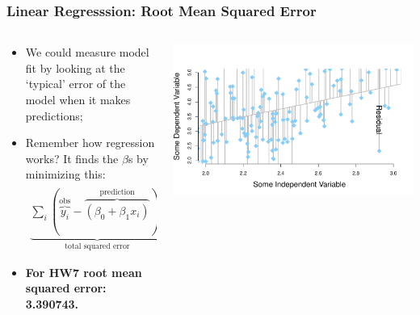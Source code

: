 \documentclass[aspectratio=169]{beamer}
\theoremstyle{principle}
\begin{document}
\begin{frame}
\frametitle{Linear Regresssion: Root Mean Squared Error}

\begin{columns}
\begin{column}{0.5\textwidth}

\begin{itemize}
\item We could measure model fit by looking at the `typical' error of the model when it makes predictions;
\bigskip

\item Remember how regression works?  It finds the $\beta$s by minimizing this:
\begin{align*}
\underbrace{\sum_i(\overbrace{y_i}^{\mbox{obs}} - \overbrace{(\beta_0 + \beta_1 x_i)}^{\mbox{prediction}})^2}_{\mbox{total squared error}}
\end{align*}

\item[] \color{white} \textbf{For HW7 root mean squared error: 3.390743.}
\end{itemize}

\end{column}
\begin{column}{0.5\textwidth}
\includegraphics[scale=0.35]{point_cloud_line_zoomed_residuals.pdf}
\end{column}
\end{columns}

\end{frame}
\end{document}

